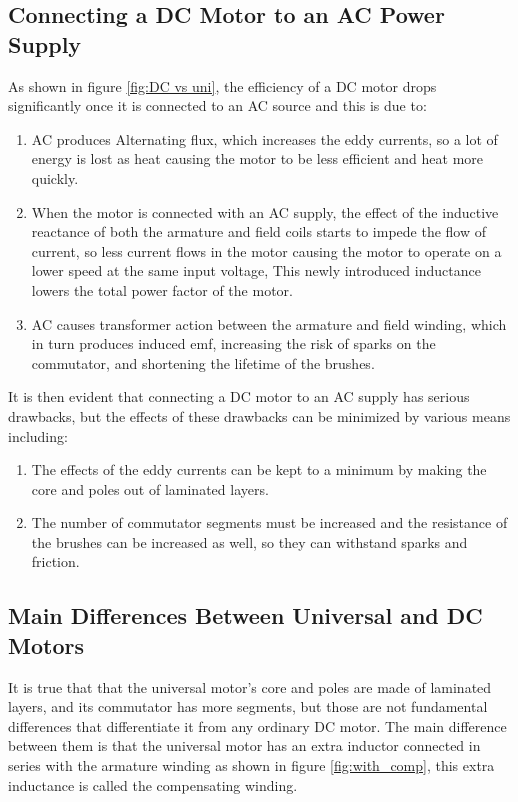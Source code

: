 \documentclass[journal]{IEEEtran}
\begin{document}
\subsection{Connecting a DC Motor to an AC Power Supply}
As shown in figure \ref{fig:DC vs uni}, the efficiency of a DC motor drops significantly once it is connected to an AC source and this is due to:
\begin{enumerate}
    \item AC produces Alternating flux, which increases the eddy currents, so a lot of energy is lost as heat causing the motor to be less efficient and heat more quickly.
    \item When the motor is connected with an AC supply, the effect of the inductive reactance of both the armature and field coils starts to impede the flow of current, so less current flows in the motor causing the motor to operate on a lower speed at the same input voltage, This newly introduced inductance lowers the total power factor of the motor.
    \item AC causes transformer action between the armature and field winding, which in turn produces induced emf, increasing the risk of sparks on the commutator, and shortening the lifetime of the brushes.\cite{guru2007}
\end{enumerate}


It is then evident that connecting a DC motor to an AC supply has serious drawbacks, but the effects of these drawbacks can be minimized by various means including:
\begin{enumerate}
    \item The effects of the eddy currents can be kept to a minimum by making the core and poles out of laminated layers.
    \item The number of commutator segments must be increased and the resistance of the brushes can be increased as well, so they can withstand sparks and friction.\cite{guru2007}
\end{enumerate}

\subsection{Main Differences Between Universal and DC Motors}
It is true that that the universal motor's core and poles are made of laminated layers, and its commutator has more segments, but those are not fundamental differences that differentiate it from any ordinary DC motor. The main difference between them is that the universal motor has an extra inductor connected in series with the armature winding as shown in figure  \ref{fig:with_comp}, this extra inductance is called the compensating winding.\cite{chapman2005}
\end{document}
